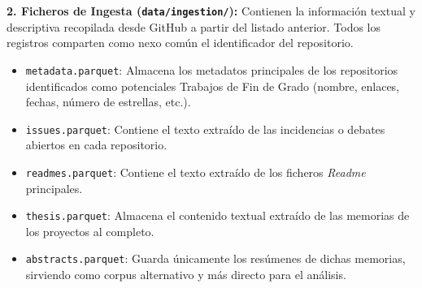\textbf{2. Ficheros de Ingesta (\texttt{data/ingestion/}):}
Contienen la información textual y descriptiva recopilada desde GitHub a partir del listado anterior. Todos los registros comparten como nexo común el identificador del repositorio.
\begin{itemize}
    \item \texttt{metadata.parquet}: Almacena los metadatos principales de los repositorios identificados como potenciales Trabajos de Fin de Grado (nombre, enlaces, fechas, número de estrellas, etc.).
    \item \texttt{issues.parquet}: Contiene el texto extraído de las incidencias o debates abiertos en cada repositorio.
    \item \texttt{readmes.parquet}: Contiene el texto extraído de los ficheros \textit{Readme} principales.
    \item \texttt{thesis.parquet}: Almacena el contenido textual extraído de las memorias de los proyectos al completo.
    \item \texttt{abstracts.parquet}: Guarda únicamente los resúmenes de dichas memorias, sirviendo como corpus alternativo y más directo para el análisis.
\end{itemize}


